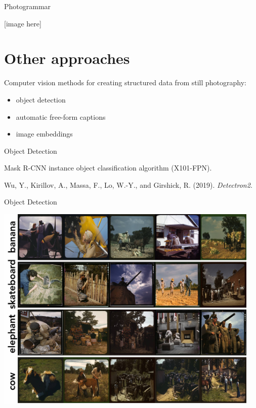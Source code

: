 \documentclass[12pt,ignorenonframetext,aspectratio=169]{beamer}
\makeatletter
\newcommand{\orange}[1]{\textcolor{solarized@orange}{#1}}
\makeatother
\begin{document}
\begin{frame}{Photogrammar}

[image here]

\end{frame}

\section{Other approaches}

\begin{frame}{}

Computer vision methods for creating structured data from still photography:

\begin{itemize}
\item object detection
\item automatic free-form captions
\item image embeddings
\end{itemize}

\end{frame}

\begin{frame}{Object Detection}

\orange{Mask R-CNN} instance object classification algorithm (X101-FPN).

Wu, Y., Kirillov, A., Massa, F., Lo, W.-Y., and Girshick, R. (2019). \textit{Detectron2}.

\end{frame}

\begin{frame}{Object Detection}

\begin{center}
\includegraphics[width=0.95\textwidth]{../figures/max_things_grid_labels_small.jpg}
\end{center}

\end{frame}
\end{document}
